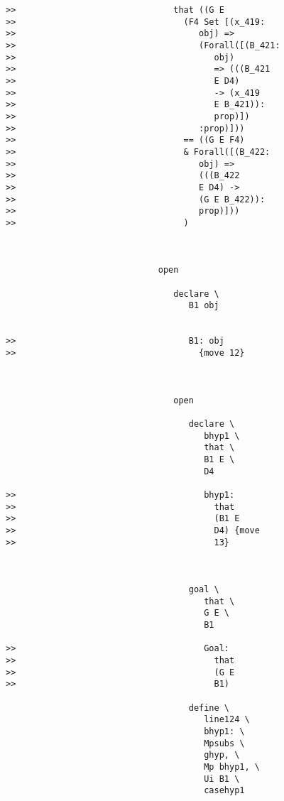 \documentclass[12pt]{article}
\begin{document}
\begin{verbatim}
>>                               that ((G E
>>                                 (F4 Set [(x_419:
>>                                    obj) =>
>>                                    (Forall([(B_421:
>>                                       obj)
>>                                       => (((B_421
>>                                       E D4)
>>                                       -> (x_419
>>                                       E B_421)):
>>                                       prop)])
>>                                    :prop)]))
>>                                 == ((G E F4)
>>                                 & Forall([(B_422:
>>                                    obj) =>
>>                                    (((B_422
>>                                    E D4) ->
>>                                    (G E B_422)):
>>                                    prop)]))
>>                                 )



                              open

                                 declare \
                                    B1 obj


>>                                  B1: obj
>>                                    {move 12}



                                 open

                                    declare \
                                       bhyp1 \
                                       that \
                                       B1 E \
                                       D4

>>                                     bhyp1:
>>                                       that
>>                                       (B1 E
>>                                       D4) {move
>>                                       13}



                                    goal \
                                       that \
                                       G E \
                                       B1

>>                                     Goal:
>>                                       that
>>                                       (G E
>>                                       B1)

                                    define \
                                       line124 \
                                       bhyp1: \
                                       Mpsubs \
                                       ghyp, \
                                       Mp bhyp1, \
                                       Ui B1 \
                                       casehyp1



\end{verbatim}
\end{document}
